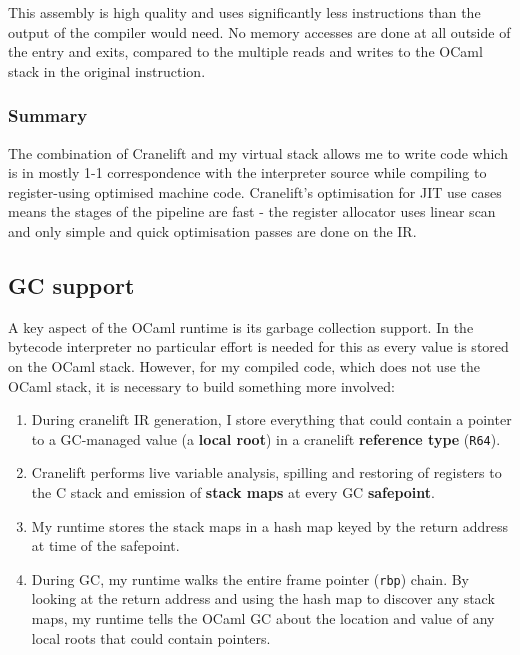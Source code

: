 This assembly is high quality and uses significantly less instructions than the output of the
compiler would need. No memory accesses are done at all outside of the entry and exits, compared to
the multiple reads and writes to the OCaml stack in the original instruction.

\subsubsection{Summary}

The combination of Cranelift and my virtual stack allows me to write code which is in mostly 1-1
correspondence with the interpreter source while compiling to register-using optimised machine
code. Cranelift's optimisation for JIT use cases means the stages of the pipeline are fast - the
register allocator uses linear scan and only simple and quick optimisation passes are done on the
IR.

\subsection{GC support} \label{gc-support}

A key aspect of the OCaml runtime is its garbage collection support. In the bytecode interpreter no
particular effort is needed for this as every value is stored on the OCaml stack. However, for my
compiled code, which does not use the OCaml stack, it is necessary to build something more
involved:

\begin{enumerate}
      \item During cranelift IR generation, I store everything that could contain a pointer to a
            GC-managed value (a \textbf{local root}) in a cranelift \textbf{reference type}
            (\texttt{R64}).
      \item Cranelift performs live variable analysis, spilling and restoring of registers to the C
            stack and emission of \textbf{stack maps} at every GC \textbf{safepoint}.
      \item My runtime stores the stack maps in a hash map keyed by the return address at time of
            the safepoint.
      \item During GC, my runtime walks the entire frame pointer (\texttt{rbp}) chain. By looking
            at the return address and using the hash map to discover any stack maps, my runtime
            tells the OCaml GC about the location and value of any local roots that could contain
            pointers.
\end{enumerate}

